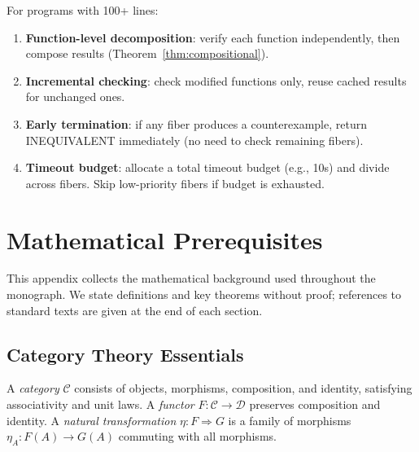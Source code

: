 For programs with 100+ lines:
\begin{enumerate}
  \item \textbf{Function-level decomposition}: verify each function
    independently, then compose results (Theorem~\ref{thm:compositional}).
  \item \textbf{Incremental checking}: check modified functions only,
    reuse cached results for unchanged ones.
  \item \textbf{Early termination}: if any fiber produces a
    counterexample, return INEQUIVALENT immediately (no need to
    check remaining fibers).
  \item \textbf{Timeout budget}: allocate a total timeout budget
    (e.g., 10s) and divide across fibers.  Skip low-priority fibers
    if budget is exhausted.
\end{enumerate}



\appendix

\chapter{Mathematical Prerequisites}
\label{app:prereqs}

This appendix collects the mathematical background used throughout
the monograph.  We state definitions and key theorems without proof;
references to standard texts are given at the end of each section.

\section{Category Theory Essentials}

A \emph{category} $\mathcal{C}$ consists of objects, morphisms,
composition, and identity, satisfying associativity and unit laws.
A \emph{functor} $F : \mathcal{C} \to \mathcal{D}$ preserves
composition and identity.  A \emph{natural transformation}
$\eta : F \Rightarrow G$ is a family of morphisms $\eta_A : F(A) \to
G(A)$ commuting with all morphisms.


